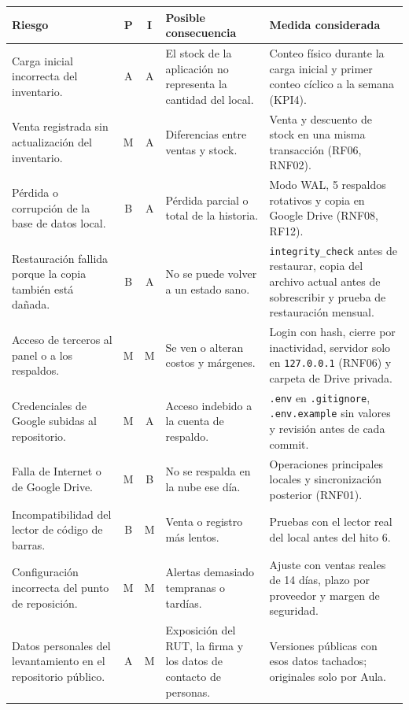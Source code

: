 \documentclass[10pt,a4paper]{article}
\begin{document}
\small
\begin{longtable}{|p{}|c|c|p{}|p{}|}
\hline
\textbf{Riesgo} & \textbf{P} & \textbf{I} & \textbf{Posible consecuencia} & \textbf{Medida considerada} \\
\hline
\endhead
Carga inicial incorrecta del inventario. & A & A & El stock de la aplicación no representa la cantidad del local. & Conteo físico durante la carga inicial y primer conteo cíclico a la semana (KPI4). \\
\hline
Venta registrada sin actualización del inventario. & M & A & Diferencias entre ventas y stock. & Venta y descuento de stock en una misma transacción (RF06, RNF02). \\
\hline
Pérdida o corrupción de la base de datos local. & B & A & Pérdida parcial o total de la historia. & Modo WAL, 5 respaldos rotativos y copia en Google Drive (RNF08, RF12). \\
\hline
Restauración fallida porque la copia también está dañada. & B & A & No se puede volver a un estado sano. & \texttt{integrity\_check} antes de restaurar, copia del archivo actual antes de sobrescribir y prueba de restauración mensual. \\
\hline
Acceso de terceros al panel o a los respaldos. & M & M & Se ven o alteran costos y márgenes. & Login con hash, cierre por inactividad, servidor solo en \texttt{127.0.0.1} (RNF06) y carpeta de Drive privada. \\
\hline
Credenciales de Google subidas al repositorio. & M & A & Acceso indebido a la cuenta de respaldo. & \texttt{.env} en \texttt{.gitignore}, \texttt{.env.example} sin valores y revisión antes de cada commit. \\
\hline
Falla de Internet o de Google Drive. & M & B & No se respalda en la nube ese día. & Operaciones principales locales y sincronización posterior (RNF01). \\
\hline
Incompatibilidad del lector de código de barras. & B & M & Venta o registro más lentos. & Pruebas con el lector real del local antes del hito 6. \\
\hline
Configuración incorrecta del punto de reposición. & M & M & Alertas demasiado tempranas o tardías. & Ajuste con ventas reales de 14 días, plazo por proveedor y margen de seguridad. \\
\hline
Datos personales del levantamiento en el repositorio público. & A & M & Exposición del RUT, la firma y los datos de contacto de personas. & Versiones públicas con esos datos tachados; originales solo por Aula. \\
\hline
\end{longtable}
\normalsize
\end{document}
